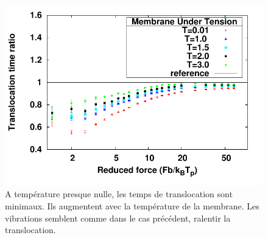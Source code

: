 \begin{figure}[H]
\begin{center}
\includegraphics[width=1\textwidth]{hightension.pdf}
\caption[Effet de la température sur la membrane tendue]{A température presque nulle, les temps de translocation sont minimaux. Ils augmentent avec la température de la membrane. Les vibrations semblent comme dans le cas précédent, ralentir la translocation.} 
\label{membranetendueevoltemp}
\end{center}
\end{figure}




